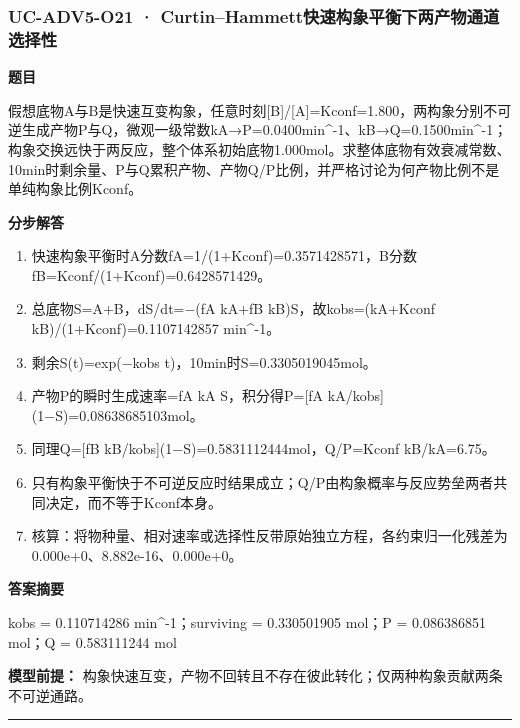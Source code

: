 \documentclass[UTF8,11pt,a4paper]{ctexart}
\begin{document}
\subsubsection*{UC-ADV5-O21 · Curtin–Hammett快速构象平衡下两产物通道选择性}
\noindent\textbf{题目}\par
假想底物A与B是快速互变构象，任意时刻[B]/[A]=Kconf=1.800，两构象分别不可逆生成产物P与Q，微观一级常数kA→P=0.0400min\textasciicircum{}-1、kB→Q=0.1500min\textasciicircum{}-1；构象交换远快于两反应，整个体系初始底物1.000mol。求整体底物有效衰减常数、10min时剩余量、P与Q累积产物、产物Q/P比例，并严格讨论为何产物比例不是单纯构象比例Kconf。\par
\medskip\noindent\textbf{分步解答}
\begin{enumerate}
\item 快速构象平衡时A分数fA=1/(1+Kconf)=0.3571428571，B分数fB=Kconf/(1+Kconf)=0.6428571429。
\item 总底物S=A+B，dS/dt=−(fA kA+fB kB)S，故kobs=(kA+Kconf kB)/(1+Kconf)=0.1107142857 min\textasciicircum{}-1。
\item 剩余S(t)=exp(−kobs t)，10min时S=0.3305019045mol。
\item 产物P的瞬时生成速率=fA kA S，积分得P=[fA kA/kobs](1−S)=0.08638685103mol。
\item 同理Q=[fB kB/kobs](1−S)=0.5831112444mol，Q/P=Kconf kB/kA=6.75。
\item 只有构象平衡快于不可逆反应时结果成立；Q/P由构象概率与反应势垒两者共同决定，而不等于Kconf本身。
\item 核算：将物种量、相对速率或选择性反带原始独立方程，各约束归一化残差为 0.000e+0、8.882e-16、0.000e+0。
\end{enumerate}
\noindent\textbf{答案摘要}\par
kobs = 0.110714286 min\textasciicircum{}-1；surviving = 0.330501905 mol；P = 0.086386851 mol；Q = 0.583111244 mol\par
\noindent\textbf{模型前提：}
构象快速互变，产物不回转且不存在彼此转化；仅两种构象贡献两条不可逆通路。\par
\medskip\hrule\medskip
{}
\end{document}
